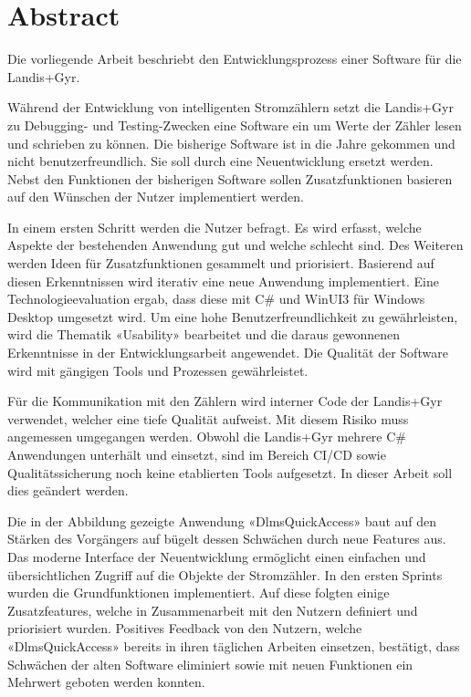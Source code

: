 \begingroup
\let\clearpage\relax
\let\cleardoublepage\relax
\let\cleardoublepage\relax

\cleardoublepage


\chapter*{Abstract}
Die vorliegende Arbeit beschriebt den Entwicklungsprozess einer Software für die Landis+Gyr.

Während der Entwicklung von intelligenten Stromzählern setzt die Landis+Gyr zu Debugging- und Testing-Zwecken eine Software ein um Werte der Zähler lesen und schrieben zu können.
Die bisherige Software ist in die Jahre gekommen und nicht benutzerfreundlich.
Sie soll durch eine Neuentwicklung ersetzt werden.
Nebst den Funktionen der bisherigen Software sollen Zusatzfunktionen basieren auf den Wünschen der Nutzer implementiert werden.

In einem ersten Schritt werden die Nutzer befragt.
Es wird erfasst, welche Aspekte der bestehenden Anwendung gut und welche schlecht sind.
Des Weiteren werden Ideen für Zusatzfunktionen gesammelt und priorisiert.
Basierend auf diesen Erkenntnissen wird iterativ eine neue Anwendung implementiert.
Eine Technologieevaluation ergab, dass diese mit C\# und WinUI3 für Windows Desktop umgesetzt wird.
Um eine hohe Benutzerfreundlichkeit zu gewährleisten, wird die Thematik «Usability» bearbeitet und die daraus gewonnenen Erkenntnisse in der Entwicklungsarbeit angewendet.
Die Qualität der Software wird mit gängigen Tools und Prozessen gewährleistet.

Für die Kommunikation mit den Zählern wird interner Code der Landis+Gyr verwendet, welcher eine tiefe Qualität aufweist.
Mit diesem Risiko muss angemessen umgegangen werden.
Obwohl die Landis+Gyr mehrere C\# Anwendungen unterhält und einsetzt, sind im Bereich CI/CD sowie Qualitätssicherung noch keine etablierten Tools aufgesetzt.
In dieser Arbeit soll dies geändert werden.

Die in der Abbildung gezeigte Anwendung «DlmsQuickAccess» baut auf den Stärken des Vorgängers auf bügelt dessen Schwächen durch neue Features aus.
Das moderne Interface der Neuentwicklung ermöglicht einen einfachen und übersichtlichen Zugriff auf die Objekte der Stromzähler. 
In den ersten Sprints wurden die Grundfunktionen implementiert.
Auf diese folgten einige Zusatzfeatures, welche in Zusammenarbeit mit den Nutzern definiert und priorisiert wurden.
Positives Feedback von den Nutzern, welche «DlmsQuickAccess» bereits in ihren täglichen Arbeiten einsetzen, bestätigt, dass Schwächen der alten Software eliminiert sowie mit neuen Funktionen ein Mehrwert geboten werden konnten.


